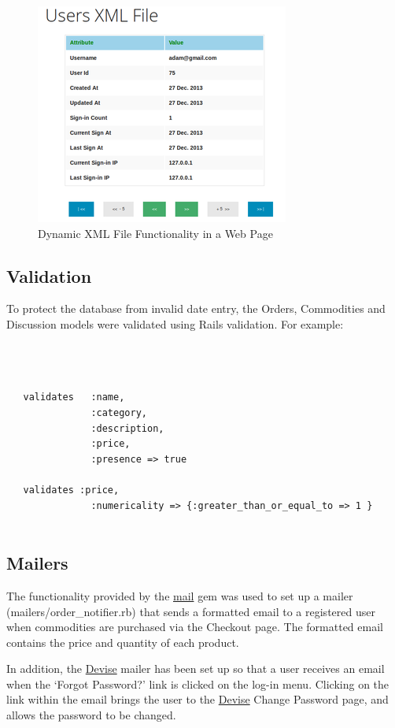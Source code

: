 \documentclass[11pt]{article}
\begin{document}
\begin{figure}
\centering
\includegraphics[scale=1]{./images/dxml.png}
\hypertarget{label:figdypict}{\caption{Dynamic XML File Functionality in a Web Page}}
\label{label:dypict}
\end{figure}




\subsection{Validation}
To protect the database from invalid date entry, the
Orders,
Commodities and
Discussion 
models were validated using Rails validation. 
For example:
\begin{verbatim}



   validates   :name,
               :category,            
               :description,            
               :price,
               :presence => true

   validates :price,
               :numericality => {:greater_than_or_equal_to => 1 }
               
  \end{verbatim}          


\subsection{Mailers}
The functionality provided by the \href{http://rubygems.org/gems/mail}{mail} gem was
used to set up a mailer (mailers/order\_notifier.rb) 
that sends a formatted email
to a registered user 
when commodities are purchased via the Checkout page.
The formatted email contains the price and quantity of each product. 

In addition, the \href{https://github.com/plataformatec/devise}{Devise} mailer has been set up so that
a user receives an email when the `Forgot Password?' link is clicked on
the log-in menu. 
Clicking on the link within the email brings the user to the
 \href{https://github.com/plataformatec/devise}{Devise} Change Password 
page, and allows the password to be changed.
\end{document}
